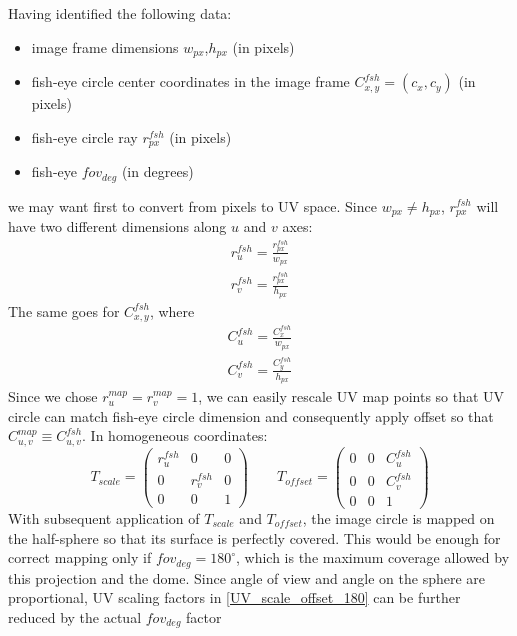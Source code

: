 Having identified the following data:
\begin{itemize}
\item image frame dimensions $w_{px}$,$h_{px}$ (in pixels)
\item fish-eye circle center coordinates in the image frame $C^{fsh}_{x,y}=(c_x,c_y)$ (in pixels)
\item fish-eye circle ray $r^{fsh}_{px}$ (in pixels)
\item fish-eye $fov_{deg}$ (in degrees)
\end{itemize}
we may want first to convert from pixels to UV space. Since $w_{px} \ne h_{px}$, $r^{fsh}_{px}$ will have two different dimensions along $u$ and $v$ axes:
\begin{equation}
\begin{array}{c}
r^{fsh}_{u}=\frac{r^{fsh}_{px}}{w_{px}}\\[0.6em]
r^{fsh}_{v}=\frac{r^{fsh}_{px}}{h_{px}}
\end{array}
\end{equation}
The same goes for $C^{fsh}_{x,y}$, where
\begin{equation}
\begin{array}{c}
C^{fsh}_{u}=\frac{C^{fsh}_{x}}{w_{px}}\\[0.6em]
C^{fsh}_{v}=\frac{C^{fsh}_{y}}{h_{px}}
\end{array}
\end{equation}
Since we chose $r^{map}_{u}=r^{map}_{v}=1$, we can easily rescale UV map points so that UV circle can match fish-eye circle dimension and consequently apply offset so that $C^{map}_{u,v} \equiv C^{fsh}_{u,v}$. In homogeneous coordinates:
\begin{equation}
T_{scale} = \left( \begin{array}{ccc}
r^{fsh}_{u} & 0 & 0 \\[0.5em]
0 & r^{fsh}_{v} & 0 \\[0.5em]
0 & 0 & 1
\end{array} \right)
\qquad
T_{offset} = \left( \begin{array}{ccc}
0 & 0 & C^{fsh}_{u} \\[0.5em]
0 & 0 & C^{fsh}_{v} \\[0.5em]
0 & 0 & 1
\end{array} \right)
\label{UV_scale_offset_180}
\end{equation}
With subsequent application of $T_{scale}$ and $T_{offset}$, the image circle is mapped on the half-sphere so that its surface is perfectly covered. This would be enough for correct mapping only if $fov_{deg} = 180^{\circ}$, which is the maximum coverage allowed by this projection and the dome. Since angle of view and angle on the sphere are proportional, UV scaling factors in \ref{UV_scale_offset_180} can be further reduced by the actual $fov_{deg}$ factor
